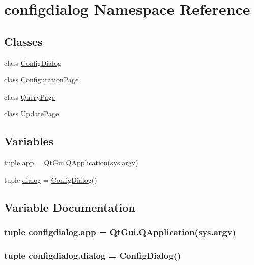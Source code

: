 \hypertarget{namespaceconfigdialog}{}\section{configdialog Namespace Reference}
\label{namespaceconfigdialog}
\subsection*{Classes}
\begin{DoxyCompactItemize}
\item 
class \hyperlink{classconfigdialog_1_1ConfigDialog}{Config\+Dialog}
\item 
class \hyperlink{classconfigdialog_1_1ConfigurationPage}{Configuration\+Page}
\item 
class \hyperlink{classconfigdialog_1_1QueryPage}{Query\+Page}
\item 
class \hyperlink{classconfigdialog_1_1UpdatePage}{Update\+Page}
\end{DoxyCompactItemize}
\subsection*{Variables}
\begin{DoxyCompactItemize}
\item 
tuple \hyperlink{namespaceconfigdialog_a5698f7b454d11fe44b6354d56b8b426b}{app} = Qt\+Gui.\+Q\+Application(sys.\+argv)
\item 
tuple \hyperlink{namespaceconfigdialog_a0a67f8f227c29dedcae194e57da16371}{dialog} = \hyperlink{classconfigdialog_1_1ConfigDialog}{Config\+Dialog}()
\end{DoxyCompactItemize}


\subsection{Variable Documentation}
\hypertarget{namespaceconfigdialog_a5698f7b454d11fe44b6354d56b8b426b}{}
\subsubsection[{app}]{\setlength{\rightskip}{0pt plus 5cm}tuple configdialog.\+app = Qt\+Gui.\+Q\+Application(sys.\+argv)}\label{namespaceconfigdialog_a5698f7b454d11fe44b6354d56b8b426b}
\hypertarget{namespaceconfigdialog_a0a67f8f227c29dedcae194e57da16371}{}
\subsubsection[{dialog}]{\setlength{\rightskip}{0pt plus 5cm}tuple configdialog.\+dialog = {\bf Config\+Dialog}()}\label{namespaceconfigdialog_a0a67f8f227c29dedcae194e57da16371}
